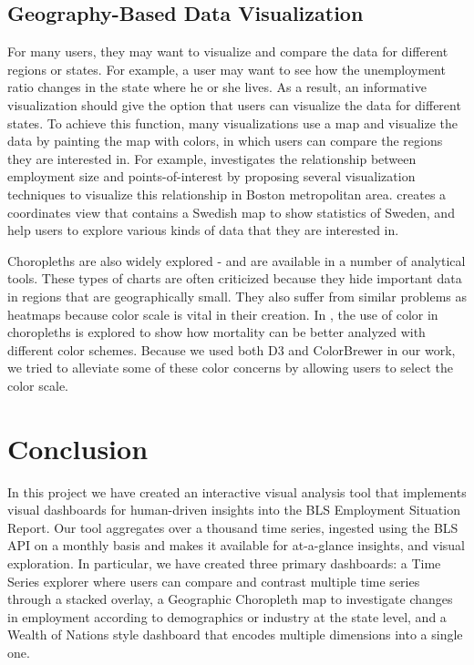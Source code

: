 \documentclass{sigchi}
\begin{document}
\subsection{Geography-Based Data Visualization}

For many users, they may want to visualize and compare the data for different regions or states. For example, a user may want to see how the unemployment ratio changes in the state where he or she lives. As a result, an informative visualization should give the option that users can visualize the data for different states. To achieve this function, many visualizations use a map and visualize the data by painting the map with colors, in which users can compare the regions they are interested in. For example, \cite{rodrigues_estimating_2013} investigates the relationship between employment size and points-of-interest by proposing several visualization techniques to visualize this relationship in Boston metropolitan area. \cite{feldt_tailor-made_2005} creates a coordinates view that contains a Swedish map to show statistics of Sweden, and help users to explore various kinds of data that they are interested in.

Choropleths are also widely explored - and are available in a number of analytical tools. These types of charts are often criticized because they hide important data in regions that are geographically small. They also suffer from similar problems as heatmaps because color scale is vital in their creation. In \cite{brewer_mapping_1997}, the use of color in choropleths is explored to show how mortality can be better analyzed with different color schemes. Because we used both D3 \cite{bostock_d3_2011} and ColorBrewer in our work, we tried to alleviate some of these color concerns by allowing users to select the color scale.

\section{Conclusion}

In this project we have created an interactive visual analysis tool that implements visual dashboards for human-driven insights into the BLS Employment Situation Report. Our tool aggregates over a thousand time series, ingested using the BLS API on a monthly basis and makes it available for at-a-glance insights, and visual exploration. In particular, we have created three primary dashboards: a Time Series explorer where users can compare and contrast multiple time series through a stacked overlay, a Geographic Choropleth map to investigate changes in employment according to demographics or industry at the state level, and a Wealth of Nations style dashboard that encodes multiple dimensions into a single one.
\end{document}
